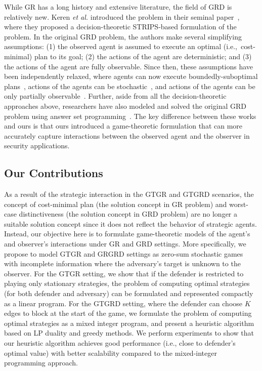 While GR has a long history and extensive literature, the field of GRD is relatively new. Keren \emph{et al.} introduced the problem in their seminal paper~\cite{keren:14}, where they proposed a decision-theoretic STRIPS-based formulation of the problem. In the original GRD problem, the authors make several simplifying assumptions: (1) the observed agent is assumed to execute an optimal (i.e.,~cost-minimal) plan to its goal; (2) the actions of the agent are deterministic; and (3) the actions of the agent are fully observable. Since then, these assumptions have been independently relaxed, where agents can now execute boundedly-suboptimal plans~\cite{keren:15}, actions of the agents can be stochastic~\cite{wayllace:16}, and actions of the agents can be only partially observable~\cite{keren:16}. Further, aside from all the decision-theoretic approaches above, researchers have also modeled and solved the original GRD problem using answer set programming~\cite{son:16}. The key difference between these works and ours is that ours introduced a game-theoretic formulation that can more accurately capture interactions between the observed agent and the observer in security applications.  

\subsection{Our Contributions}
As a result of the strategic interaction in the GTGR and GTGRD scenarios, the concept of cost-minimal plan (the solution concept in GR problem) 
and worst-case distinctiveness (the solution concept in GRD problem)
are no longer a suitable solution concept since it does not reflect the behavior of strategic agents.
Instead, our objective here is to formulate game-theoretic models of the agent's and observer's interactions 
under GR and GRD settings. 
More specifically, we propose to model GTGR and GRGRD settings as zero-sum stochastic games
with incomplete information where the adversary's target is unknown to the observer. 
For the GTGR setting,
we show that if the defender is restricted to playing only stationary strategies, 
the problem of computing optimal strategies (for both defender and adversary)
can be formulated and represented compactly as a linear program.
For the GTGRD setting,
where the defender can choose $K$ edges to block at the start of the game, 
we formulate the problem of computing optimal strategies as a mixed integer program,
and present a heuristic algorithm
based on LP duality and greedy methods.
We perform experiments to show that our heuristic algorithm
achieves good performance (i.e., close to defender's optimal value) with better scalability
compared to the mixed-integer programming approach.

